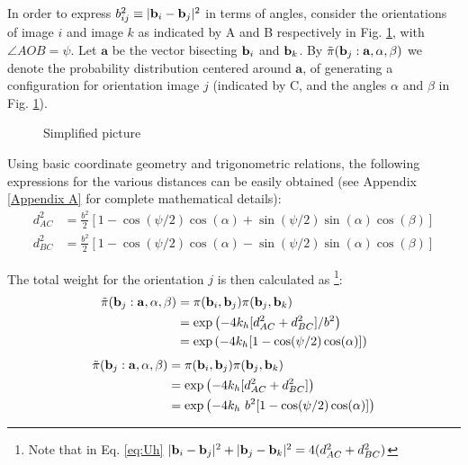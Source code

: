         In order to express $b^2_{ij} \equiv |{\mathbf {b}}_i - {\mathbf {b}}_{j}|^2$ in terms of angles, consider the orientations of image $i$ and image $k$ as indicated by A and B respectively in Fig. \ref{fig:simple}, with $\angle AOB = \psi$. Let $\mathbf a$ be the vector bisecting ${\mathbf {b}}_i$ and  ${\mathbf {b}}_k$. By $\tilde \pi({\mathbf {b}}_j: \mathbf{a}, \alpha, \beta)$ we denote the probability distribution centered around $\mathbf a$, of generating a configuration for orientation image $j$ (indicated by C, and the angles $\alpha$ and $\beta$ in Fig. \ref{fig:simple}).
        \begin{figure}[!htbp]
            \centering
            \def\svgwidth{0.25\columnwidth}
            
            \caption{Simplified picture}
            \label{fig:simple}
        \end{figure}
        Using basic coordinate geometry and trigonometric relations, the following expressions for the various distances can be easily obtained (see Appendix \ref{Appendix A} for complete mathematical details):
        \begin{equation}
        \label{eq:deltax}
            \begin{aligned}
                d_{AC}^2 &= \frac{b^2}{2} [1 - \cos(\psi/2) \cos(\alpha) + \sin(\psi/2) \sin(\alpha) \cos(\beta)]\\
                d_{BC}^2 &= \frac{b^2}{2} [1 - \cos(\psi/2) \cos(\alpha) - \sin(\psi/2) \sin(\alpha) \cos(\beta)]
            \end{aligned}
        \end{equation}

        The total weight for the orientation $j$ is then calculated as \footnote{Note that in Eq. \eqref{eq:Uh} $|{\mathbf {b}}_i - {\mathbf {b}}_j|^2 + |{\mathbf {b}}_j - {\mathbf {b}}_k|^2 = 4 (d_{AC}^2 + d_{BC}^2)$}:
        \ifkhExplicitP
            \begin{equation}
            \label{eq:Uh}
                \begin{aligned}
                    \tilde \pi({\mathbf {b}}_j: \mathbf{a}, \alpha, \beta)  &= \pi({\mathbf {b}}_i,{\mathbf {b}}_j)\pi({\mathbf {b}}_j,{\mathbf {b}}_k)\\
                    &= \exp\left(-4 k_h [d_{AC}^2 + d_{BC}^2]/b^2\right)\\
                    &= \exp\left(-4 k_h [1 - \cos(\psi/2) \cos(\alpha)]\right)
                \end{aligned}
            \end{equation}
        \else
            \begin{equation}
            \label{eq:Uh}
                \begin{aligned}
                    \tilde \pi({\mathbf {b}}_j: \mathbf{a}, \alpha, \beta)  &= \pi({\mathbf {b}}_i,{\mathbf {b}}_j)\pi({\mathbf {b}}_j,{\mathbf {b}}_k)\\
                    &= \exp\left(-4 k_h [d_{AC}^2 + d_{BC}^2]\right)\\
                    &= \exp\left(-4k_h~b^2 [1 - \cos(\psi/2) \cos(\alpha)]\right)
                \end{aligned}
            \end{equation}
        \fi

